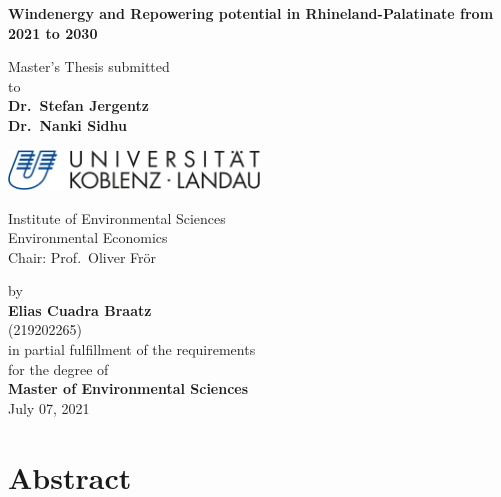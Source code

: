\documentclass[a4paper,11pt]{article}
\begin{document}
\thispagestyle{empty}
\begin{center}
  \vspace*{5mm}
  \linespread{1.5}
  {\huge{\bf Windenergy and Repowering potential in Rhineland-Palatinate from 2021 to 2030}\par}\vspace{1cm}
  Master's Thesis submitted \\\vspace{0.5cm}
  to \\\vspace{0.5cm}
  \textbf{Dr.~Stefan Jergentz} \\
  \textbf{Dr.~Nanki Sidhu} \\\vspace{1.5cm}
  
  
  \includegraphics[width=0.5\textwidth]{Uni-Logo-2.jpg}
  
  Institute of Environmental Sciences \\
  Environmental Economics \\
   Chair: Prof.~Oliver Frör \\  \vspace{1cm}

  
  
  by \\\vspace{0.5cm}
  \textbf{Elias Cuadra Braatz} \\
  (219202265) \\
  
  \medskip
  \medskip
  in partial fulfillment of the requirements \\
  for the degree of \\
  \textbf{Master of Environmental Sciences} \\\vspace{0.5cm}
  July 07, 2021
  
\end{center}


\newpage
\tableofcontents
\clearpage

\newpage
\hypertarget{abstract}{%
\section*{Abstract}\label{abstract}}
\end{document}
